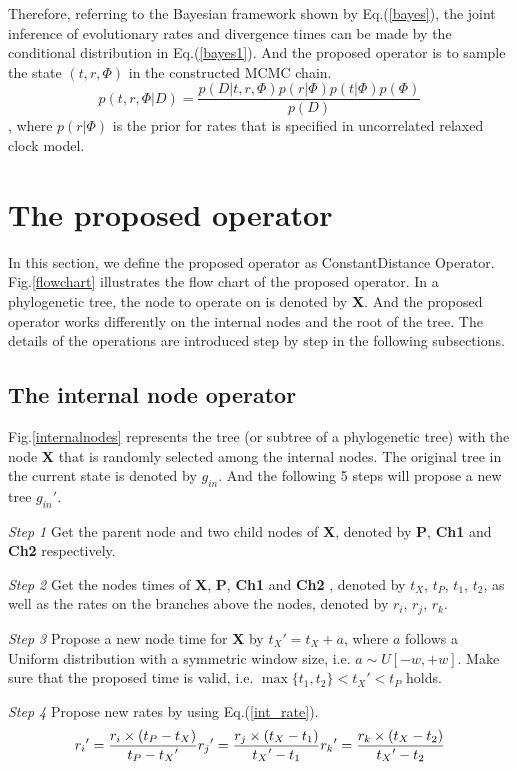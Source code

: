 \documentclass{bmcart}
\begin{document}
Therefore, referring to the Bayesian framework shown by Eq.(\ref{bayes}), the joint inference of evolutionary rates and divergence times can be made by the conditional distribution in Eq.(\ref{bayes1}). And the proposed operator is to sample the state $(t,r,\Phi)$ in the constructed MCMC chain.
\begin{equation}\label{bayes1}
p(t,r,\Phi |D) = \frac{{p(D|t,r,\Phi )p(r|\Phi )p(t|\Phi )p(\Phi )}}{{p(D)}}
\end{equation}
, where $p(r|\Phi )$ is the prior for rates that is specified in uncorrelated relaxed clock model.
\section*{The proposed operator}
In this section, we define the proposed operator as ConstantDistance Operator. Fig.\ref{flowchart} illustrates the flow chart of the proposed operator. In a phylogenetic tree, the node to operate on is denoted by \textbf{X}. And the proposed operator works differently on the internal nodes and the root of the tree. The details of the operations are introduced step by step in the following subsections.
\subsection*{The internal node operator}
Fig.\ref{internalnodes} represents the tree (or subtree of a phylogenetic tree) with the node \textbf{X} that is randomly selected among the internal nodes. The original tree in the current state is denoted by $g_{in}$. And the following 5 steps will propose a new tree ${g_{in}}'$.

\emph{Step 1} Get the parent node and two child nodes of \textbf{X}, denoted by \textbf{P}, \textbf{Ch1} and \textbf{Ch2} respectively.

\emph{Step 2} Get the nodes times of \textbf{X}, \textbf{P}, \textbf{Ch1} and \textbf{Ch2} , denoted by $t_X$, $t_P$, $t_1$, $t_2$, as well as the rates on the branches above the nodes, denoted by $r_i$, $r_j$, $r_k$.

\emph{Step 3} Propose a new node time for \textbf{X} by ${t_X}' = {t_X} + a$, where $a$ follows a Uniform distribution with a symmetric window size, i.e. $a \sim U[ - w, + w]$. Make sure that the proposed time is valid, i.e. $\max \{ {t_1},{t_2}\}  < {t_X}' < {t_P}$ holds.

\emph{Step 4} Propose new rates by using Eq.(\ref{int_rate}).
\begin{equation}
 \label{int_rate}
{r_i}' = \frac{{r_i} \times ({{t_P} - {t_X}})}{{{t_P} - {t_X}'}}\\
{r_j}' = \frac{{{r_j} \times ({{t_X} - {t_1}})}}{{{t_X}' - {t_1}}}\\
{r_k}' = \frac{{{r_k} \times ({{t_X} - {t_2}})}}{{{t_X}' - {t_2}}}
 \end{equation}
\end{document}

